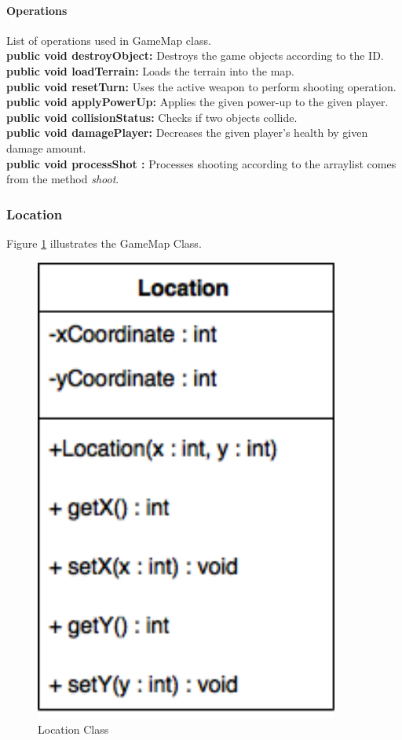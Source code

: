 \documentclass[12pt]{article} %
\begin{document}
\paragraph{Operations \\}
List of operations used in GameMap class.\\
\textbf{public void destroyObject:} Destroys the game objects according to the ID. \\
\textbf{public void loadTerrain:} Loads the terrain into the map. \\
\textbf{public void resetTurn:} Uses the active weapon to perform shooting operation. \\
\textbf{public void applyPowerUp:} Applies the given power-up to the given player.\\
\textbf{public void collisionStatus:} Checks if two objects collide.\\
\textbf{public void damagePlayer:} Decreases the given player's health by given damage amount.\\
\textbf{public void processShot	:} Processes shooting according to the arraylist comes from the method  \textit{shoot}.





\subsubsection{Location} %

Figure \ref{fig:location} illustrates the GameMap Class.
\begin{figure}[h!]
   \centering
   \vspace{10pt}%
   \includegraphics[width=10cm]{location.png}
   \caption{Location Class}
   \label{fig:location}
\end{figure}
\end{document}
